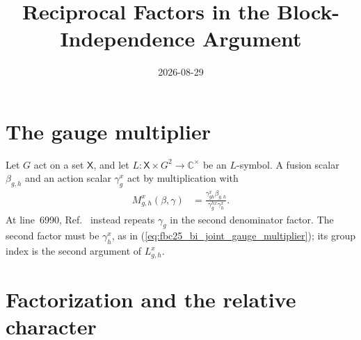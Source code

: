 \documentclass{article}
\title{Reciprocal Factors in the Block-Independence Argument}
\author{}
\date{2026-08-29}
\begin{document}
\maketitle
{}

\section{The gauge multiplier}

Let $G$ act on a set $\mathsf X$, and let
$L\colon\mathsf X\times G^2\to\mathbb C^\times$ be an $L$-symbol. A fusion
scalar $\beta_{g,h}$ and an action scalar $\gamma^x_g$ act by multiplication
with
\begin{align}
    M^x_{g,h}(\beta,\gamma)
        &=\frac{\gamma^x_{gh}\beta_{g,h}}
        {\gamma^{h x}_g\gamma^x_h}.
    \label{eq:fbc25_bi_joint_gauge_multiplier}
\end{align}
At line~6990, Ref.~\cite{FrancoRubio2025MPUGauging} instead repeats
$\gamma_g$ in the second denominator factor. The second factor must be
$\gamma_h^x$, as in
(\ref{eq:fbc25_bi_joint_gauge_multiplier}); its group index is the second
argument of $L^x_{g,h}$.

\section{Factorization and the relative character}
\end{document}
